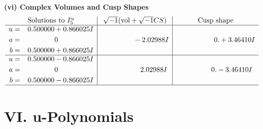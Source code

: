 \documentclass[1p]{elsarticle_modified}
\theoremstyle{definition}
\newcommand{\I}{\sqrt{-1}}
\begin{document}
\newpage\flushleft \textbf{(vi) Complex Volumes and Cusp Shapes}
$$\begin{array}{c|c|c}  
\text{Solutions to }I^u_{5}& \I (\text{vol} + \sqrt{-1}CS) & \text{Cusp shape}\\
 \hline 
\begin{aligned}
u &= \phantom{-}0.500000 + 0.866025 I \\
a &= \phantom{-0.000000 } 0 \\
b &= \phantom{-}0.500000 + 0.866025 I\end{aligned}
 & \phantom{-0.000000 } -2.02988 I & \phantom{-0.000000 -}0. + 3.46410 I \\ \hline\begin{aligned}
u &= \phantom{-}0.500000 - 0.866025 I \\
a &= \phantom{-0.000000 } 0 \\
b &= \phantom{-}0.500000 - 0.866025 I\end{aligned}
 & \phantom{-0.000000 -}2.02988 I & \phantom{-0.000000 } 0. - 3.46410 I\\
 \hline 
 \end{array}$$\newpage
\newpage\renewcommand{\arraystretch}{1}
\centering \section*{ VI. u-Polynomials}
\end{document}
